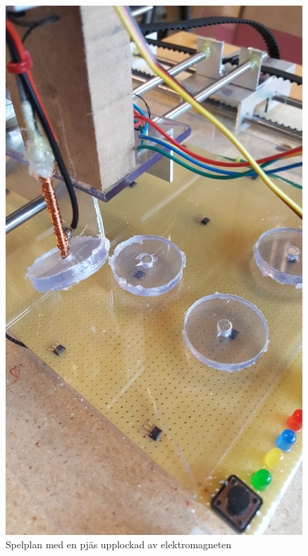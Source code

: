 \documentclass[a4paper]{article}
\begin{document}
\begin{figure}\label{elektromagnet}
\centering
\includegraphics[width=\textwidth,keepaspectratio]{../images/elektromagnet}
\caption{Spelplan med en pjäs upplockad av elektromagneten}
\end{figure}
\end{document}
